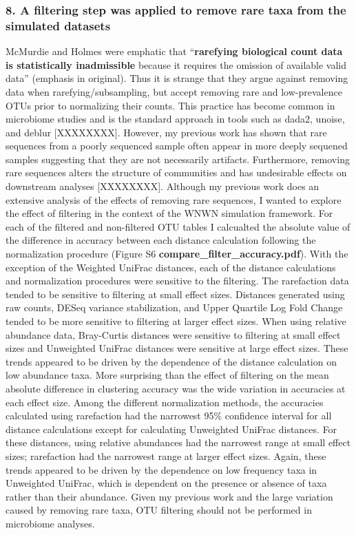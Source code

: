 \documentclass[
]{article}
\begin{document}
\hypertarget{a-filtering-step-was-applied-to-remove-rare-taxa-from-the-simulated-datasets}{%
\subsubsection{8. A filtering step was applied to remove rare taxa from
the simulated
datasets}\label{a-filtering-step-was-applied-to-remove-rare-taxa-from-the-simulated-datasets}}

McMurdie and Holmes were emphatic that ``\textbf{rarefying biological
count data is statistically inadmissible} because it requires the
omission of available valid data'' (emphasis in original). Thus it is
strange that they argue against removing data when
rarefying/subsampling, but accept removing rare and low-prevalence OTUs
prior to normalizing their counts. This practice has become common in
microbiome studies and is the standard approach in tools such as dada2,
unoise, and deblur {[}XXXXXXXX{]}. However, my previous work has shown
that rare sequences from a poorly sequenced sample often appear in more
deeply sequened samples suggesting that they are not necessarily
artifacts. Furthermore, removing rare sequences alters the structure of
communities and has undesirable effects on downstream analyses
{[}XXXXXXXX{]}. Although my previous work does an extensive analysis of
the effects of removing rare sequences, I wanted to explore the effect
of filtering in the context of the WNWN simulation framework. For each
of the filtered and non-filtered OTU tables I calcualted the absolute
value of the difference in accuracy between each distance calculation
following the normalization procedure (Figure S6
\textbf{compare\_filter\_accuracy.pdf}). With the exception of the
Weighted UniFrac distances, each of the distance calculations and
normalization procedures were sensitive to the filtering. The
rarefaction data tended to be sensitive to filtering at small effect
sizes. Distances generated using raw counts, DESeq variance
stabilization, and Upper Quartile Log Fold Change tended to be more
sensitive to filtering at larger effect sizes. When using relative
abundance data, Bray-Curtis distances were sensitive to filtering at
small effect sizes and Unweighted UniFrac distances were sensitive at
large effect sizes. These trends appeared to be driven by the dependence
of the distance calculation on low abundance taxa. More surprising than
the effect of filtering on the mean absolute difference in clustering
accuracy was the wide variation in accuracies at each effect size. Among
the different normalization methods, the accuracies calculated using
rarefaction had the narrowest 95\% confidence interval for all distance
calculations except for calculating Unweighted UniFrac distances. For
these distances, using relative abundances had the narrowest range at
small effect sizes; rarefaction had the narrowest range at larger effect
sizes. Again, these trends appeared to be driven by the dependence on
low frequency taxa in Unweighted UniFrac, which is dependent on the
presence or absence of taxa rather than their abundance. Given my
previous work and the large variation caused by removing rare taxa, OTU
filtering should not be performed in microbiome analyses.
\end{document}

